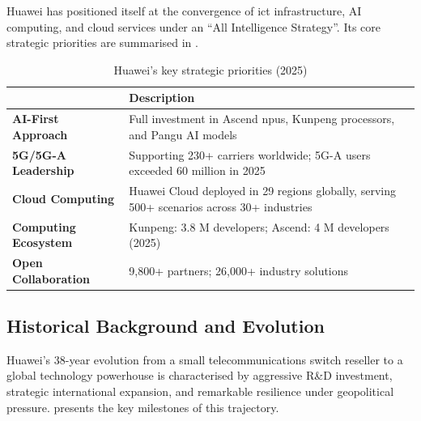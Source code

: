 Huawei has positioned itself at the convergence of \acrshort{ict}
infrastructure, AI computing, and cloud services under an ``All Intelligence
Strategy''. Its core strategic priorities are summarised in
.

\begin{table}[htbp]
  \centering
  \caption{Huawei's key strategic priorities (2025)}
  \label{tab:huawei-strategic-priorities}
  \begin{tabularx}{0.92\textwidth}{>{\bfseries}lX}
    \toprule
    \tableheader{Strategic Priority & Description} \\
    \midrule
    AI-First Approach     & Full investment in Ascend \acrshort{npu}s,
                            Kunpeng processors, and Pangu AI models \\
    \rowcolor{TableRowOdd}
    5G/5G-A Leadership    & Supporting 230+ carriers worldwide; 5G-A users
                            exceeded 60 million in 2025 \\
    Cloud Computing       & Huawei Cloud deployed in 29 regions globally,
                            serving 500+ scenarios across 30+ industries \\
    \rowcolor{TableRowOdd}
    Computing Ecosystem   & Kunpeng: 3.8 M developers; Ascend: 4 M developers
                            (2025) \\
    Open Collaboration    & 9,800+ partners; 26,000+ industry solutions \\
    \bottomrule
  \end{tabularx}
\end{table}

\subsection{Historical Background and Evolution}
\label{subsec:huawei-history}

Huawei's 38-year evolution from a small telecommunications switch reseller to
a global technology powerhouse is characterised by aggressive R\&D investment,
strategic international expansion, and remarkable resilience under geopolitical
pressure.  presents the key milestones of this
trajectory.

